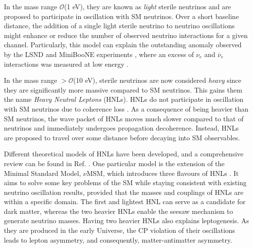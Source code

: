 In the mass range $\mathcal{O}$(1 eV), they are known as \textit{light} sterile neutrinos and are proposed to participate in oscillation with SM neutrinos.
Over a short baseline distance, the addition of a single light sterile neutrino to neutrino oscillations might enhance or reduce the number of observed neutrino interactions for a given channel. 
Particularly, this model can explain the outstanding anomaly observed by the LSND \cite{LSND_anomaly} and MiniBooNE experiments \cite{Miniboone_anomaly}, where an excess of $\nu_e$ and $\overline{\nu}_e$ interactions was measured at low energy \cite{HNLWhitePaper}. 

In the mass range $> \mathcal{O}$(10 eV), sterile neutrinos are now considered \textit{heavy} since they are significantly more massive compared to SM neutrinos.
This gains them the name \textit{Heavy Neutral Leptons} (HNLs).
HNLs do not participate in oscillation with SM neutrinos due to coherence loss \cite{SBNHNL}.
As a consequence of being heavier than SM neutrinos, the wave packet of HNLs moves much slower compared to that of neutrinos and immediately undergoes propagation decoherence.
Instead, HNLs are proposed to travel over some distance before decaying into SM observables.

Different theoretical models of HNLs have been developed, and a comprehensive review can be found in Ref. \cite{HNLPresentFuture}. 
One particular model is the extension of the Minimal Standard Model, $\nu$MSM, which introduces three flavours of HNLs \cite{nuMSM1, nuMSM2}.
It aims to solve some key problems of the SM while staying consistent with existing neutrino oscillation results, provided that the masses and couplings of HNLs are within a specific domain.
The first and lightest HNL can serve as a candidate for dark matter, whereas the two heavier HNLs enable the seesaw mechanism to generate neutrino masses.
Having two heavier HNLs also explains leptogenesis.
As they are produced in the early Universe, the CP violation of their oscillations leads to lepton asymmetry, and consequently, matter-antimatter asymmetry.

